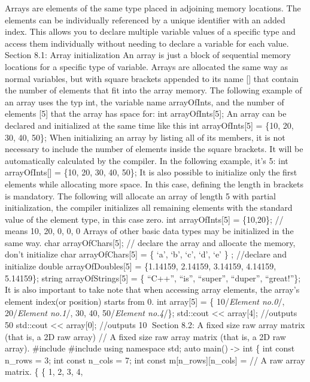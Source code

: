 Arrays are elements of the same type placed in adjoining memory
locations. The elements can be individually referenced by a unique
identiﬁer with an added index. This allows you to declare multiple
variable values of a speciﬁc type and access them individually without
needing to declare a variable for each value. Section 8.1: Array
initialization An array is just a block of sequential memory locations
for a speciﬁc type of variable. Arrays are allocated the same way as
normal variables, but with square brackets appended to its name {[}{]}
that contain the number of elements that ﬁt into the array memory. The
following example of an array uses the typ int, the variable name
arrayOfInts, and the number of elements {[}5{]} that the array has space
for: int arrayOfInts{[}5{]}; An array can be declared and initialized at
the same time like this int arrayOfInts{[}5{]} = \{10, 20, 30, 40, 50\};
When initializing an array by listing all of its members, it is not
necessary to include the number of elements inside the square brackets.
It will be automatically calculated by the compiler. In the following
example, it's 5: int arrayOfInts{[}{]} = \{10, 20, 30, 40, 50\}; It is
also possible to initialize only the ﬁrst elements while allocating more
space. In this case, deﬁning the length in brackets is mandatory. The
following will allocate an array of length 5 with partial
initialization, the compiler initializes all remaining elements with the
standard value of the element type, in this case zero. int
arrayOfInts{[}5{]} = \{10,20\}; // means 10, 20, 0, 0, 0 Arrays of other
basic data types may be initialized in the same way. char
arrayOfChars{[}5{]}; // declare the array and allocate the memory, don't
initialize char arrayOfChars{[}5{]} = \{ `a', `b', `c', `d', `e' \} ;
//declare and initialize double arrayOfDoubles{[}5{]} = \{1.14159,
2.14159, 3.14159, 4.14159, 5.14159\}; string arrayOfStrings{[}5{]} = \{
``C++'', ``is'', ``super'', ``duper'', ``great!''\}; It is also
important to take note that when accessing array elements, the array's
element index(or position) starts from 0. int array{[}5{]} = \{
10/\emph{Element no.0}/, 20/\emph{Element no.1}/, 30, 40,
50/\emph{Element no.4}/\}; std::cout \textless\textless{} array{[}4{]};
//outputs 50 std::cout \textless\textless{} array{[}0{]}; //outputs 10
Section 8.2: A ﬁxed size raw array matrix (that is, a 2D raw array) //
A fixed size raw array matrix (that is, a 2D raw array). \#include
\#include using namespace std; auto main() -\textgreater{} int \{ int
const n\_rows = 3; int const n\_cols = 7; int const
m{[}n\_rows{]}{[}n\_cols{]} = // A raw array matrix. \{ \{ 1, 2, 3, 4,

